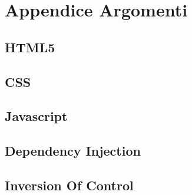 \chapter{Appendice Argomenti} %

\label{Appendice} %
\section{HTML5}
\section{CSS}
\section{Javascript}
\section{Dependency Injection}
\label{app:DepInj}
\section{Inversion Of Control}